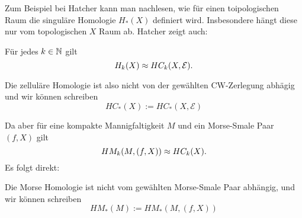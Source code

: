 Zum Beispiel bei Hatcher \cite{hatcher} kann man nachlesen, wie für einen toipologischen Raum die 
singuläre Homologie $H_{\ast} (X)$ definiert wird. Insbesondere hängt diese nur vom topologischen 
$X$ Raum ab. Hatcher zeigt auch: 

\begin{theorem}
    \label{satz: zellulaere Homologie ist singuläre Homologie}
    Für jedes $k \in { \mathbb N }$ gilt 
    \[ H_k (X) \approx HC_k (X, \mathcal{E}) . \]
\end{theorem}

Die zelluläre Homologie ist also nicht von der gewählten CW-Zerlegung abhägig und wir können schreiben
\[ HC_{\ast} (X) := HC_{\ast} (X, \mathcal{E}) \]

Da aber für eine kompakte Mannigfaltigkeit $M$ und ein Morse-Smale Paar $(f, X)$ gilt 
\[ HM_k(M, (f, X)) \approx HC_k(X) . \]
Es folgt direkt:

\begin{theorem}
    Die Morse Homologie ist nicht vom gewählten Morse-Smale Paar abhängig, und wir können schreiben
    \[ HM_{\ast} (M) := HM_{\ast}(M, (f, X)) \]
\end{theorem}
